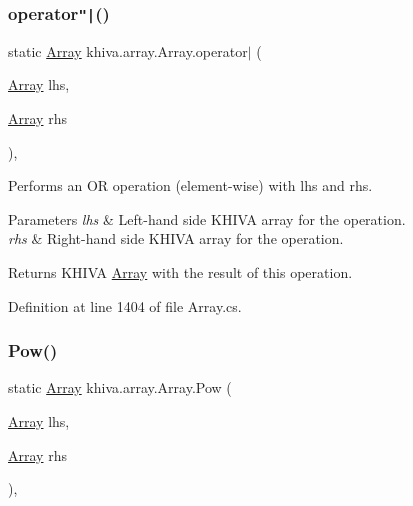\subsubsection{\texorpdfstring{operator\texttt{"|}()}{operator|()}}
{\footnotesize\ttfamily static \mbox{\hyperlink{classkhiva_1_1array_1_1_array}{Array}} khiva.\+array.\+Array.\+operator$\vert$ (\begin{DoxyParamCaption}\item[{\mbox{\hyperlink{classkhiva_1_1array_1_1_array}{Array}}}]{lhs,  }\item[{\mbox{\hyperlink{classkhiva_1_1array_1_1_array}{Array}}}]{rhs }\end{DoxyParamCaption})\hspace{0.3cm}{\ttfamily [inline]}, {\ttfamily [static]}}



Performs an OR operation (element-\/wise) with lhs and rhs. 


\begin{DoxyParams}{Parameters}
{\em lhs} & Left-\/hand side K\+H\+I\+VA array for the operation.\\
\hline
{\em rhs} & Right-\/hand side K\+H\+I\+VA array for the operation.\\
\hline
\end{DoxyParams}
\begin{DoxyReturn}{Returns}
K\+H\+I\+VA \mbox{\hyperlink{classkhiva_1_1array_1_1_array}{Array}} with the result of this operation.
\end{DoxyReturn}


Definition at line 1404 of file Array.\+cs.

\mbox{\label{classkhiva_1_1array_1_1_array_a1d73dc0fe824ffc5667f64b995c80bdc}} 
\subsubsection{\texorpdfstring{Pow()}{Pow()}}
{\footnotesize\ttfamily static \mbox{\hyperlink{classkhiva_1_1array_1_1_array}{Array}} khiva.\+array.\+Array.\+Pow (\begin{DoxyParamCaption}\item[{\mbox{\hyperlink{classkhiva_1_1array_1_1_array}{Array}}}]{lhs,  }\item[{\mbox{\hyperlink{classkhiva_1_1array_1_1_array}{Array}}}]{rhs }\end{DoxyParamCaption})\hspace{0.3cm}{\ttfamily [inline]}, {\ttfamily [static]}}



